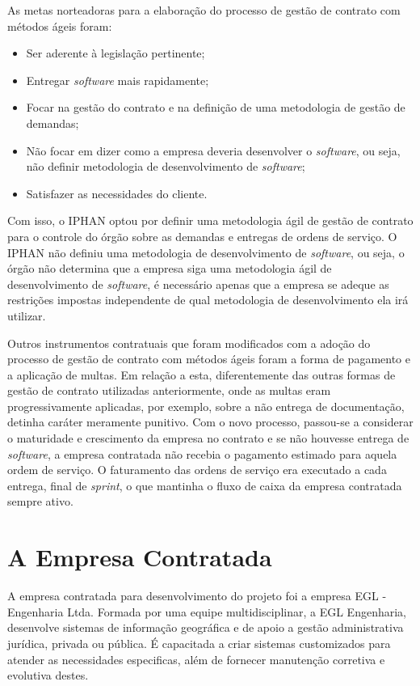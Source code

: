 As metas norteadoras para a elaboração do processo de gestão de contrato com métodos ágeis foram:
\begin{itemize}
\item Ser aderente à legislação pertinente;
\item Entregar \textit{software} mais rapidamente;
\item Focar na gestão do contrato e na definição de uma metodologia de gestão de demandas;
\item Não focar em dizer como a empresa deveria desenvolver o \textit{software}, ou seja, não definir metodologia de desenvolvimento de \textit{software};
\item Satisfazer as necessidades do cliente.
\end{itemize}

Com isso, o IPHAN optou por definir uma metodologia ágil de gestão de contrato para o controle do órgão sobre as demandas e entregas de ordens de serviço. O IPHAN não definiu uma metodologia de desenvolvimento de \textit{software}, ou seja, o órgão não determina que a empresa siga uma metodologia ágil de desenvolvimento de \textit{software}, é necessário apenas que a empresa se adeque as restrições impostas independente de qual metodologia de desenvolvimento ela irá utilizar.

Outros instrumentos contratuais que foram modificados com a adoção do processo de gestão de contrato com métodos ágeis foram a forma de pagamento e a aplicação de multas. Em relação a esta, diferentemente das outras formas de gestão de contrato utilizadas anteriormente, onde as multas eram progressivamente aplicadas, por exemplo, sobre a não entrega de documentação, detinha caráter meramente punitivo. Com o novo processo, passou-se a considerar o maturidade e crescimento da empresa no contrato e  se não houvesse entrega de \textit{software}, a empresa contratada não recebia o pagamento estimado para aquela ordem de serviço. O faturamento das ordens de serviço era executado a cada entrega, final de \textit{sprint}, o que mantinha o fluxo de caixa da empresa contratada sempre ativo.


\section[A Empresa Contratada]{A Empresa Contratada}

A empresa contratada para desenvolvimento do projeto foi a empresa EGL - Engenharia Ltda. Formada por uma equipe multidisciplinar, a EGL Engenharia, desenvolve sistemas de informação geográfica e de apoio a gestão administrativa jurídica, privada ou pública. É capacitada a criar sistemas customizados para atender as necessidades especificas, além de fornecer manutenção corretiva e evolutiva destes.

